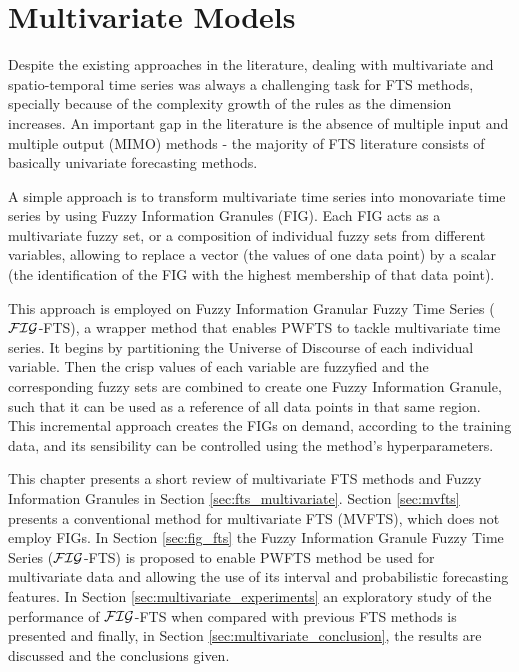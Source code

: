 
\chapter{Multivariate Models}
\label{chap:multivariate}

Despite the existing approaches in the literature, dealing with multivariate and spatio-temporal time series was always a challenging task for FTS methods, specially because of the complexity growth of the rules as the dimension increases. An important gap in the literature is the absence of multiple input and multiple output (MIMO) methods - the majority of FTS literature consists of basically univariate forecasting methods.  

A simple approach is to transform multivariate time series into monovariate time series by using Fuzzy Information Granules (FIG). Each FIG acts as a multivariate fuzzy set, or a composition of individual fuzzy sets from different variables, allowing to replace a vector (the values of one data point) by a scalar (the identification of the FIG with the highest membership of that data point).

This approach is employed on Fuzzy Information Granular Fuzzy Time Series ($\mathcal{FIG}$-FTS), a wrapper method that enables PWFTS to tackle multivariate time series. It begins by partitioning the Universe of Discourse of each individual variable. Then the crisp values of each variable are fuzzyfied and the corresponding fuzzy sets are combined to create one Fuzzy Information Granule, such that it can be used as a reference of all data points in that same region. This incremental approach creates the FIGs on demand, according to the training data, and its sensibility can be controlled using the method's hyperparameters. 

This chapter presents a short review of multivariate FTS methods and Fuzzy Information Granules in Section \ref{sec:fts_multivariate}. Section \ref{sec:mvfts} presents a conventional method for multivariate FTS (MVFTS), which does not employ FIGs. In Section \ref{sec:fig_fts} the Fuzzy Information Granule Fuzzy Time Series ($\mathcal{FIG}$-FTS) is proposed to enable PWFTS method be used for multivariate data and allowing the use of its interval and probabilistic forecasting features. In Section \ref{sec:multivariate_experiments} an exploratory study of the performance of $\mathcal{FIG}$-FTS when compared with previous FTS methods is presented and finally, in Section \ref{sec:multivariate_conclusion}, the results are discussed and the conclusions given. 


